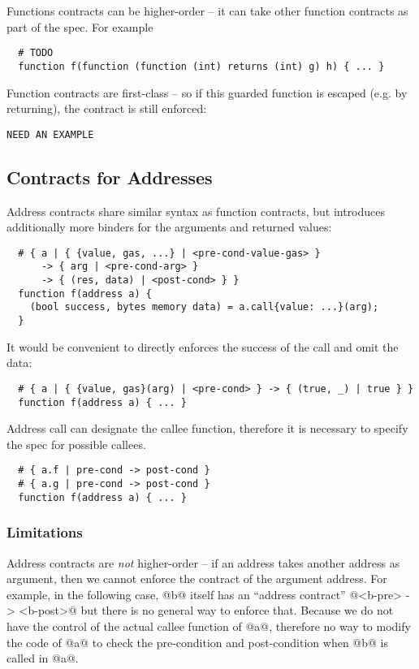 \documentclass[acmsmall,review,anonymous]{acmart}\settopmatter{printfolios=true,printccs=false,printacmref=false}
\begin{document}
Functions contracts can be higher-order -- it can take other function contracts
as part of the spec. For example
\begin{lstlisting}
  # TODO
  function f(function (function (int) returns (int) g) h) { ... }
\end{lstlisting}

Function contracts are first-class -- so if this guarded function is escaped
(e.g. by returning), the contract is still enforced:
\begin{lstlisting}
NEED AN EXAMPLE
\end{lstlisting}


\subsection{Contracts for Addresses}

Address contracts share similar syntax as function contracts, but introduces
additionally more binders for the arguments and returned values:

\begin{lstlisting}
  # { a | { {value, gas, ...} | <pre-cond-value-gas> }
      -> { arg | <pre-cond-arg> }
      -> { (res, data) | <post-cond> } }
  function f(address a) {
    (bool success, bytes memory data) = a.call{value: ...}(arg);
  }
\end{lstlisting}

It would be convenient to directly enforces the success of the call and omit
the data:
\begin{lstlisting}
  # { a | { {value, gas}(arg) | <pre-cond> } -> { (true, _) | true } }
  function f(address a) { ... }
\end{lstlisting}

Address call can designate the callee function, therefore it is necessary to
specify the spec for possible callees.

\begin{lstlisting}
  # { a.f | pre-cond -> post-cond }
  # { a.g | pre-cond -> post-cond }
  function f(address a) { ... }
\end{lstlisting}


\subsubsection*{Limitations}
Address contracts are \emph{not} higher-order -- if an address takes another
address as argument, then we cannot enforce the contract of the argument
address.
For example, in the following case, @b@ itself has an ``address contract''
@<b-pre> -> <b-post>@ but there is no general way to enforce that.
Because we do not have the control of the actual callee function of @a@,
therefore no way to modify the code of @a@ to check the pre-condition
and post-condition when @b@ is called in @a@.
\end{document}
